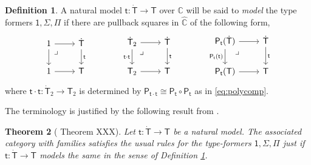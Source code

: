 \documentclass[12pt,reqno]{amsart}
\newcommand{\C}{\ensuremath{\mathbb{C}}}
\newcommand{\alg}[1]{\ensuremath{\mathsf{#1}}}
\renewcommand{\to}{\ensuremath{\rightarrow}}
\renewcommand{\t}{\ensuremath{\mathsf{t}}}
\newcommand{\tT}{\ensuremath{{\t}:\TT\to\T}}
\newcommand{\T}{\ensuremath{\mathsf{T}}}
\newcommand{\TT}{\ensuremath{\dot{\mathsf{T}}}}
\newcommand{\pbcorner}{\arrow[dr,phantom,"\lrcorner" very near start, shift right=.5ex]} %
\newtheorem{theorem}{Theorem}
\theoremstyle{remark}
\theoremstyle{definition}
\newtheorem{definition}[theorem]{Definition}
\begin{document}
\begin{definition}\label{def:modelthetypeformers}
A natural model $\tT$ over $\C$ will be said to \emph{model} the type formers $ \mathsf{1}, \Sigma, \Pi$ if there are pullback squares in $\hat{\C}$ of the following form,
%
\begin{equation}\label{diag:naturalmodelPiSigma1}
\begin{tikzcd}
	1 \ar[r] \ar[d] \pbcorner &  \TT \ar[d, "\t"]\\  
	1 \ar[r] & \T
 \end{tikzcd} \qquad \qquad 
 \begin{tikzcd}
	\TT_2  \ar[r] \ar[d,swap,"\t\cdot\t"] \pbcorner &  \TT \ar[d, "\t"]\\  
	\T_2 \ar[r] & \T
	 \end{tikzcd} \qquad \qquad 
	 \begin{tikzcd}
	 \alg{P}_\t(\TT) \ar[r] \ar[d,swap,"\alg{P}_\t(\t)"] \pbcorner &  \TT \ar[d, "\t"]\\  
	\alg{P}_\t(\T) \ar[r] & \T
 \end{tikzcd} 
 \end{equation}
%
where $\t\cdot\t : \dot{\T}_2 \to \T_2$ is determined by $\alg{P}_{\t\cdot\t} \cong  \alg{P}_{\t} \circ \alg{P}_{\t}$ as in \eqref{eq:polycomp}.
\end{definition}

The terminology is justified by the following result from \cite{A:NM}.

%
\begin{theorem}[\cite{Awodey:NM} Theorem XXX]\label{thm:nmcwf}
Let $\tT$ be a natural model. The associated category with families satisfies the usual rules for the type-formers $\mathsf{1}, \Sigma, \Pi$ just if $\tT$ models the same in the sense of Definition \ref{def:modelthetypeformers}.
\end{theorem}
\end{document}

